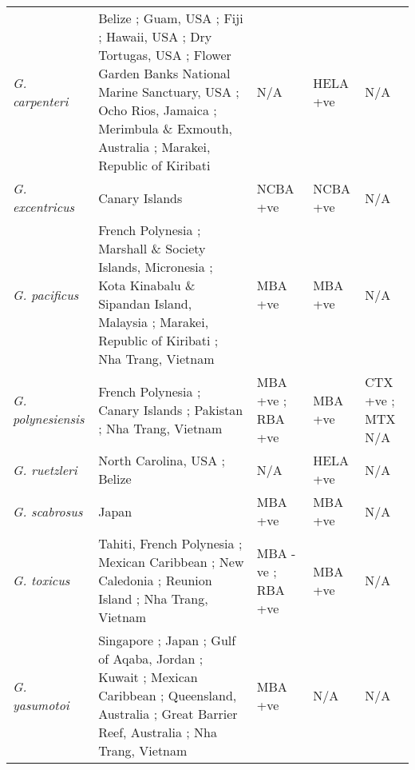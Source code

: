 \documentclass[12pt]{article}
\begin{document}
\begin{longtable}{  p{2cm}  p{5.5cm}  p{2.3cm}  p{2.3cm}  p{2.3cm}  }
	\emph{G. carpenteri} & Belize \cite{litaker2009taxonomy}; Guam, USA \cite{litaker2009taxonomy}; Fiji \cite{litaker2009taxonomy}; Hawaii, USA \cite{}; Dry Tortugas, USA \cite{holland2013differences}; Flower Garden Banks National Marine Sanctuary, USA \cite{holland2013differences}; Ocho Rios, Jamaica \cite{}; Merimbula \& Exmouth, Australia \cite{kohli2014cob}; Marakei, Republic of Kiribati \cite{xu2014distribution} & N/A & HELA +ve \cite{holland2013differences} & N/A \\
	\emph{G. excentricus} & Canary Islands \cite{fraga2011gambierdiscus} & NCBA +ve \cite{fraga2011gambierdiscus} & NCBA +ve \cite{fraga2011gambierdiscus} & N/A \\
		\emph{G. pacificus} & French Polynesia \cite{chinain1999morphology}; Marshall \& Society Islands, Micronesia \cite{litaker2010global}; Kota Kinabalu \& Sipandan Island, Malaysia \cite{mohammad2005marine}; Marakei, Republic of Kiribati \cite{xu2014distribution}; Nha Trang, Vietnam \cite{} & MBA +ve \cite{chinain1999morphology} & MBA +ve \cite{chinain1999morphology} & N/A \\
	\emph{G. polynesiensis} & French Polynesia \cite{chinain1999morphology}; Canary Islands \cite{fraga2011gambierdiscus}; Pakistan \cite{munir2011occurrence}; Nha Trang, Vietnam \cite{} & MBA +ve \cite{chinain1999morphology}; RBA +ve \cite{chinain2010growth} & MBA +ve \cite{chinain1999morphology} & CTX +ve \cite{chinain2010growth}; MTX N/A \\
	\emph{G. ruetzleri} & North Carolina, USA \cite{litaker2009taxonomy}; Belize \cite{litaker2009taxonomy} & N/A & HELA +ve \cite{holland2013differences} & N/A \\
	\emph{G. scabrosus} & Japan \cite{nishimura2013genetic} & MBA +ve \cite{nishimura2013genetic} & MBA +ve \cite{nishimura2013genetic} & N/A \\
	\emph{G. toxicus} & Tahiti, French Polynesia \cite{adachi1979thecal,chinain1999morphology}; Mexican Caribbean \cite{hernandez2004species}; New Caledonia \cite{chinain1999morphology}; Reunion Island \cite{chinain1999morphology}; Nha Trang, Vietnam \cite{roeder2010characteristic} & MBA -ve \cite{chinain1999morphology}; RBA +ve \cite{chinain2010growth} & MBA +ve \cite{chinain1999morphology} & N/A \\
	\emph{G. yasumotoi} & Singapore \cite{holmes1998gambierdiscus}; Japan \cite{nishimura2013genetic}; Gulf of Aqaba, Jordan \cite{saburova2013new}; Kuwait \cite{saburova2013new}; Mexican Caribbean \cite{hernandez2004species}; Queensland, Australia \cite{}; Great Barrier Reef, Australia \cite{murray2014molecular}; Nha Trang, Vietnam \cite{} & MBA +ve \cite{} & N/A & N/A \\ 

\end{longtable}
\end{document}
